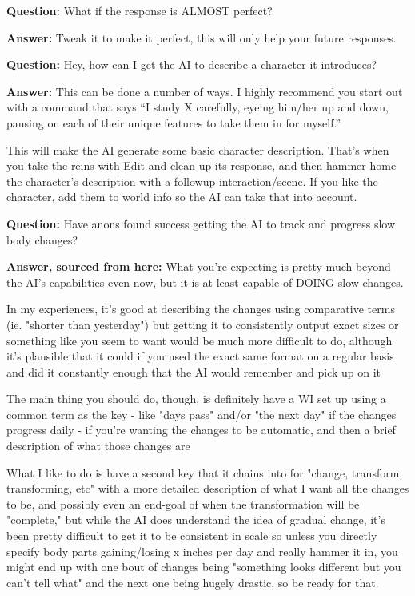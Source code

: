 \documentclass[Avsfag-main.tex]{subfiles}
\begin{document}
\textbf{Question:} What if the response is ALMOST perfect?

\textbf{Answer:} Tweak it to make it perfect, this will only help your
future responses.\smallskip

\textbf{Question:} Hey, how can I get the AI to describe a character it
introduces?

\textbf{Answer:} This can be done a number of ways. I highly recommend
you start out with a \Do command that says ``I study X carefully, eyeing
him/her up and down, pausing on each of their unique features to take
them in for myself.''

This will make the AI generate some basic character description. That's
when you take the reins with Edit and clean up its response, and then
hammer home the character's description with a followup \story
interaction/scene. If you like the character, add them to world info so
the AI can take that into account.\smallskip

\textbf{Question:} Have anons found success getting the AI to track and
progress slow body changes?

\textbf{Answer, sourced from \href{https://arch.b4k.co/vg/thread/302217086/\#302219932}{here}:}
What you're expecting is pretty much beyond the AI's capabilities even
now, but it is at least capable of DOING slow changes.

In my experiences, it's good at describing the changes using comparative
terms (ie. "shorter than yesterday") but getting it to consistently
output exact sizes or something like you seem to want would be much more
difficult to do, although it's plausible that it could if you used the
exact same format on a regular basis and did it constantly enough that
the AI would remember and pick up on it

The main thing you should do, though, is definitely have a WI set up
using a common term as the key - like "days pass" and/or "the next day"
if the changes progress daily - if you're wanting the changes to be
automatic, and then a brief description of what those changes are

What I like to do is have a second key that it chains into for "change,
transform, transforming, etc" with a more detailed description of what I
want all the changes to be, and possibly even an end-goal of when the
transformation will be "complete," but while the AI does understand the
idea of gradual change, it's been pretty difficult to get it to be
consistent in scale so unless you directly specify body parts
gaining/losing x inches per day and really hammer it in, you might end
up with one bout of changes being "something looks different but you
can't tell what" and the next one being hugely drastic, so be ready for
that.
\end{document}
